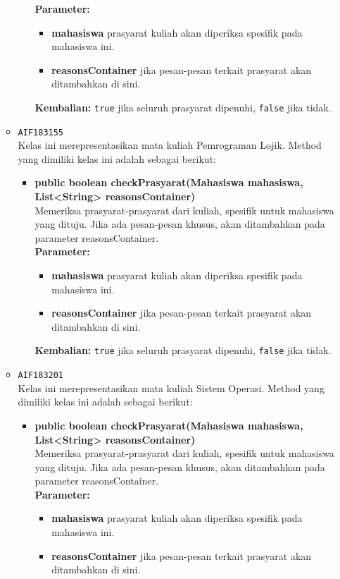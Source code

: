 \begin{enumerate}
\begin{itemize}
\begin{itemize}
\textbf{Parameter:}
\begin{itemize}
\item \textbf{mahasiswa} prasyarat kuliah akan diperiksa spesifik pada mahasiswa ini.
\item \textbf{reasonsContainer} jika pesan-pesan terkait prasyarat akan ditambahkan di sini.
\end{itemize}
\textbf{Kembalian:} \texttt{true} jika seluruh prasyarat dipenuhi, \texttt{false} jika tidak.
\end{itemize}
\item \texttt{AIF183155} \\
Kelas ini merepresentasikan mata kuliah Pemrograman Lojik. Method yang dimiliki kelas ini adalah sebagai berikut: 
\begin{itemize}
\item \textbf{public boolean checkPrasyarat(Mahasiswa mahasiswa, List<String> reasonsContainer)}\\
Memeriksa prasyarat-prasyarat dari kuliah, spesifik untuk mahasiswa yang dituju. Jika ada pesan-pesan khusus, akan ditambahkan pada parameter reasonsContainer.\\
\textbf{Parameter:}
\begin{itemize}
\item \textbf{mahasiswa} prasyarat kuliah akan diperiksa spesifik pada mahasiswa ini.
\item \textbf{reasonsContainer} jika pesan-pesan terkait prasyarat akan ditambahkan di sini.
\end{itemize}
\textbf{Kembalian:} \texttt{true} jika seluruh prasyarat dipenuhi, \texttt{false} jika tidak.
\end{itemize}
\item \texttt{AIF183201} \\
Kelas ini merepresentasikan mata kuliah Sistem Operasi. Method yang dimiliki kelas ini adalah sebagai berikut: 
\begin{itemize}
\item \textbf{public boolean checkPrasyarat(Mahasiswa mahasiswa, List<String> reasonsContainer)}\\
Memeriksa prasyarat-prasyarat dari kuliah, spesifik untuk mahasiswa yang dituju. Jika ada pesan-pesan khusus, akan ditambahkan pada parameter reasonsContainer.\\
\textbf{Parameter:}
\begin{itemize}
\item \textbf{mahasiswa} prasyarat kuliah akan diperiksa spesifik pada mahasiswa ini.
\item \textbf{reasonsContainer} jika pesan-pesan terkait prasyarat akan ditambahkan di sini.

\end{itemize}
\end{itemize}
\end{itemize}
\end{enumerate}
